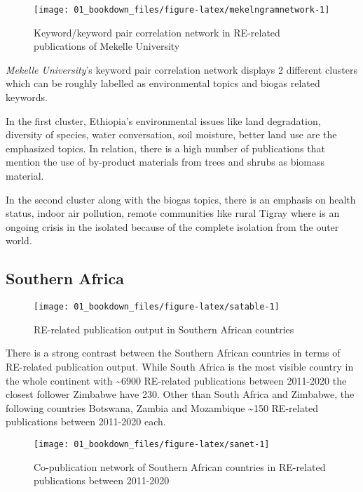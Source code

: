 \documentclass[12pt,twoside]{report}
\begin{document}
\begin{figure}
\texttt{[image: 01\_bookdown\_files/figure-latex/mekelngramnetwork-1]} \caption{Keyword/keyword pair correlation network in RE-related publications of Mekelle University}\label{fig:mekelngramnetwork}
\end{figure}

\emph{Mekelle University}'s keyword pair correlation network displays 2 different clusters which can be roughly labelled as environmental topics and biogas related keywords.

In the first cluster, Ethiopia's environmental issues like land degradation, diversity of species, water conversation, soil moisture, better land use are the emphasized topics. In relation, there is a high number of publications that mention the use of by-product materials from trees and shrubs as biomass material.

In the second cluster along with the biogas topics, there is an emphasis on health status, indoor air pollution, remote communities like rural Tigray where is an ongoing crisis in the isolated because of the complete isolation from the outer world.

\hypertarget{southern-africa}{%
\subsection{Southern Africa}\label{southern-africa}}

\begin{figure}
\texttt{[image: 01\_bookdown\_files/figure-latex/satable-1]} \caption{RE-related publication output in Southern African countries}\label{fig:satable}
\end{figure}

There is a strong contrast between the Southern African countries in terms of RE-related publication output. While South Africa is the most visible country in the whole continent with \textasciitilde6900 RE-related publications between 2011-2020 the closest follower Zimbabwe have 230. Other than South Africa and Zimbabwe, the following countries Botswana, Zambia and Mozambique \textasciitilde150 RE-related publications between 2011-2020 each.

\begin{figure}
\texttt{[image: 01\_bookdown\_files/figure-latex/sanet-1]} \caption{Co-publication network of Southern African countries in RE-related publications between 2011-2020}\label{fig:sanet}
\end{figure}
\end{document}
